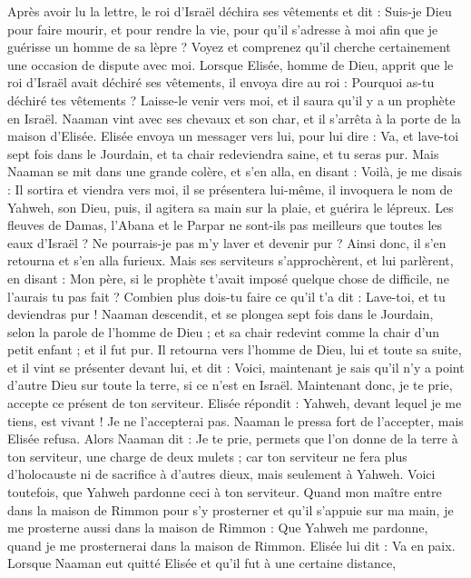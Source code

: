 \begin{multicols}{2}
Après avoir lu la lettre, le roi d’Israël déchira ses vêtements et dit : Suis-je Dieu pour faire mourir, et pour rendre la vie, pour qu’il s’adresse à moi afin que je guérisse un homme de sa lèpre ? Voyez et comprenez qu’il cherche certainement une occasion de dispute avec moi.
Lorsque Elisée, homme de Dieu, apprit que le roi d’Israël avait déchiré ses vêtements, il envoya dire au roi : Pourquoi as-tu déchiré tes vêtements ? Laisse-le venir vers moi, et il saura qu’il y a un prophète en Israël.
Naaman vint avec ses chevaux et son char, et il s’arrêta à la porte de la maison d’Elisée.
Elisée envoya un messager vers lui, pour lui dire : Va, et lave-toi sept fois dans le Jourdain, et ta chair redeviendra saine, et tu seras pur.
Mais Naaman se mit dans une grande colère, et s’en alla, en disant : Voilà, je me disais : Il sortira et viendra vers moi, il se présentera lui-même, il invoquera le nom de Yahweh, son Dieu, puis, il agitera sa main sur la plaie, et guérira le lépreux.
Les fleuves de Damas, l’Abana et le Parpar ne sont-ils pas meilleurs que toutes les eaux d’Israël ? Ne pourrais-je pas m’y laver et devenir pur ? Ainsi donc, il s’en retourna et s’en alla furieux.
Mais ses serviteurs s’approchèrent, et lui parlèrent, en disant : Mon père, si le prophète t’avait imposé quelque chose de difficile, ne l’aurais tu pas fait ? Combien plus dois-tu faire ce qu’il t’a dit : Lave-toi, et tu deviendras pur !
Naaman descendit, et se plongea sept fois dans le Jourdain, selon la parole de l’homme de Dieu ; et sa chair redevint comme la chair d’un petit enfant ; et il fut pur.
Il retourna vers l’homme de Dieu, lui et toute sa suite, et il vint se présenter devant lui, et dit : Voici, maintenant je sais qu’il n’y a point d’autre Dieu sur toute la terre, si ce n’est en Israël. Maintenant donc, je te prie, accepte ce présent de ton serviteur.
Elisée répondit : Yahweh, devant lequel je me tiens, est vivant ! Je ne l’accepterai pas. Naaman le pressa fort de l’accepter, mais Elisée refusa.
Alors Naaman dit : Je te prie, permets que l’on donne de la terre à ton serviteur, une charge de deux mulets ; car ton serviteur ne fera plus d’holocauste ni de sacrifice à d’autres dieux, mais seulement à Yahweh.
Voici toutefois, que Yahweh pardonne ceci à ton serviteur. Quand mon maître entre dans la maison de Rimmon pour s’y prosterner et qu’il s’appuie sur ma main, je me prosterne aussi dans la maison de Rimmon : Que Yahweh me pardonne, quand je me prosternerai dans la maison de Rimmon.
Elisée lui dit : Va en paix. Lorsque Naaman eut quitté Elisée et qu’il fut à une certaine distance,

\end{multicols}
